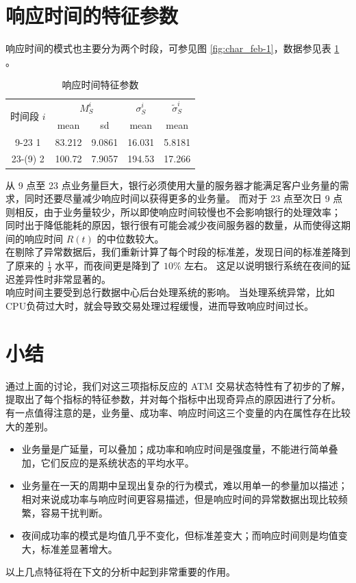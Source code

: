 \documentclass[a4paper]{article}
\begin{document}
\section{响应时间的特征参数}
\indent 响应时间的模式也主要分为两个时段，可参见图 \ref{fig:char_feb-1}，数据参见表 \ref{tab:char_R} 。
\begin{table}[H]
	\centering
	\caption{响应时间特征参数}
	\label{tab:char_R}
	\begin{tabular}{c|cc|c|c}
		\hline
		\multirow{2}{*}{时间段 $i$} & \multicolumn{2}{c}{$M_S^i$} & $\sigma_S^i$ & $\tilde{\sigma}_S^i$ \\
		& mean        & sd            & mean        & mean                 \\
		\hline
		9-23 1                   & 83.212     & 9.0861    & 16.031   & 5.8181            \\
		23-(9) 2                 & 100.72     & 7.9057     & 194.53      & 17.266            \\
		\hline
	\end{tabular}
\end{table}
从 9 点至 23 点业务量巨大，银行必须使用大量的服务器才能满足客户业务量的需求，同时还要尽量减少响应时间以获得更多的业务量。
而对于 23 点至次日 9 点则相反，由于业务量较少，所以即使响应时间较慢也不会影响银行的处理效率；
同时出于降低能耗的原因，银行很有可能会减少夜间服务器的数量，从而使得这期间的响应时间 $R(t)$ 的中位数较大。
\\
\indent 在剔除了异常数据后，我们重新计算了每个时段的标准差，发现日间的标准差降到了原来的 $\frac{1}{3}$ 水平，而夜间更是降到了 $10\%$ 左右。
这足以说明银行系统在夜间的延迟差异性时非常显著的。
\\
\indent 响应时间主要受到总行数据中心后台处理系统的影响。
当处理系统异常，比如CPU负荷过大时，就会导致交易处理过程缓慢，进而导致响应时间过长。

\section*{小结}
通过上面的讨论，我们对这三项指标反应的 ATM 交易状态特性有了初步的了解，提取出了每个指标的特征参数，并对每个指标中出现奇异点的原因进行了分析。
\\
\indent 有一点值得注意的是，业务量、成功率、响应时间这三个变量的内在属性存在比较大的差别。
\begin{itemize}
	\item 业务量是广延量，可以叠加；成功率和响应时间是强度量，不能进行简单叠加，它们反应的是系统状态的平均水平。
	\item 业务量在一天的周期中呈现出复杂的行为模式，难以用单一的参量加以描述；相对来说成功率与响应时间更容易描述，但是响应时间的异常数据出现比较频繁，容易干扰判断。
	\item 夜间成功率的模式是均值几乎不变化，但标准差变大；而响应时间则是均值变大，标准差显著增大。
\end{itemize}
以上几点特征将在下文的分析中起到非常重要的作用。
\end{document}
